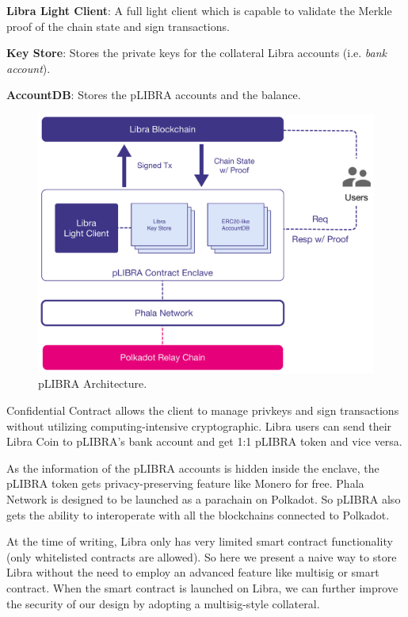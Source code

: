 \begin{icompact}
    \item \textbf{Libra Light Client}: A full light client which is capable to validate the Merkle proof of the chain state and sign transactions.
    \item \textbf{Key Store}: Stores the private keys for the collateral Libra accounts (i.e. \textit{bank account}).
    \item \textbf{AccountDB}: Stores the pLIBRA accounts and the balance.
\end{icompact}

\begin{figure}
    \centering \footnotesize
    \includegraphics[width=.7\columnwidth]{img/pLIBRA-contract}
    \caption{pLIBRA Architecture.}
    \label{fig:plibra}
\end{figure}

Confidential Contract allows the client to manage privkeys and sign transactions without utilizing computing-intensive cryptographic. Libra users can send their Libra Coin to pLIBRA's bank account and get 1:1 pLIBRA token and vice versa.

As the information of the pLIBRA accounts is hidden inside the enclave, the pLIBRA token gets privacy-preserving feature like Monero for free. Phala Network is designed to be launched as a parachain on Polkadot. So pLIBRA also gets the ability to interoperate with all the blockchains connected to Polkadot.

At the time of writing, Libra only has very limited smart contract functionality (only whitelisted contracts are allowed). So here we present a naive way to store Libra without the need to employ an advanced feature like multisig or smart contract. When the smart contract is launched on Libra, we can further improve the security of our design by adopting a multisig-style collateral.

